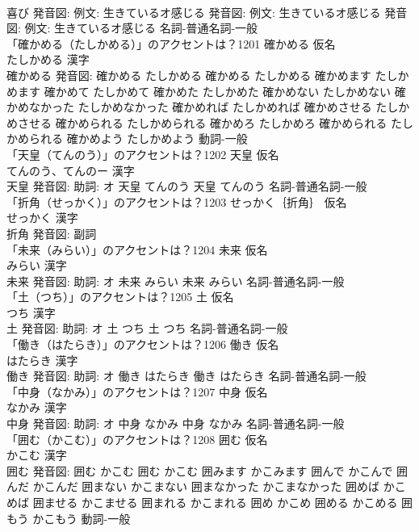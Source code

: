 \documentclass[8pt]{extreport}
\begin{document}
\begin{CJK}{UTF8}{min}
\\	喜び 発音図: 例文: 生きているオ感じる 発音図: 例文: 生きているオ感じる 発音図: 例文: 生きているオ感じる							名詞-普通名詞-一般 
\\	「確かめる（たしかめる）」のアクセントは？1201	確かめる 仮名　
\\	たしかめる 漢字　
\\	確かめる 発音図:	確かめる たしかめる		確かめる たしかめる 確かめます たしかめます 確かめて たしかめて 確かめた たしかめた 確かめない たしかめない 確かめなかった たしかめなかった 確かめれば たしかめれば 確かめさせる たしかめさせる 確かめられる たしかめられる 確かめろ たしかめろ 確かめられる たしかめられる 確かめよう たしかめよう				動詞-一般 
\\	「天皇（てんのう）」のアクセントは？1202	天皇 仮名　
\\	てんのう、てんのー 漢字　
\\	天皇 発音図: 助詞: オ	天皇 てんのう		天皇 てんのう				名詞-普通名詞-一般 
\\	「折角（せっかく）」のアクセントは？1203	せっかく｛折角｝ 仮名　
\\	せっかく 漢字　
\\	折角 発音図:							副詞 
\\	「未来（みらい）」のアクセントは？1204	未来 仮名　
\\	みらい 漢字　
\\	未来 発音図: 助詞: オ	未来 みらい		未来 みらい				名詞-普通名詞-一般 
\\	「土（つち）」のアクセントは？1205	土 仮名　
\\	つち 漢字　
\\	土 発音図: 助詞: オ	土 つち		土 つち				名詞-普通名詞-一般 
\\	「働き（はたらき）」のアクセントは？1206	働き 仮名　
\\	はたらき 漢字　
\\	働き 発音図: 助詞: オ	働き はたらき		働き はたらき				名詞-普通名詞-一般 
\\	「中身（なかみ）」のアクセントは？1207	中身 仮名　
\\	なかみ 漢字　
\\	中身 発音図: 助詞: オ	中身 なかみ		中身 なかみ				名詞-普通名詞-一般 
\\	「囲む（かこむ）」のアクセントは？1208	囲む 仮名　
\\	かこむ 漢字　
\\	囲む 発音図:	囲む かこむ		囲む かこむ 囲みます かこみます 囲んで かこんで 囲んだ かこんだ 囲まない かこまない 囲まなかった かこまなかった 囲めば かこめば 囲ませる かこませる 囲まれる かこまれる 囲め かこめ 囲める かこめる 囲もう かこもう				動詞-一般 

\end{CJK}
\end{document}
